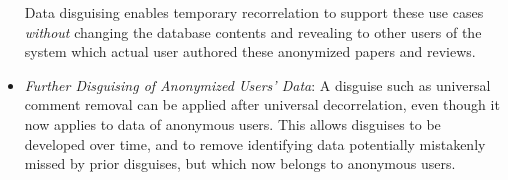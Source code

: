 \begin{itemize}
Data disguising enables temporary recorrelation to support these use cases \emph{without} changing
        the database contents and revealing to other users of the system
which actual user authored these anonymized papers and reviews.

\item \emph{Further Disguising of Anonymized Users' Data}: A disguise such as universal comment
        removal can be applied after universal decorrelation, even though it now applies to data of anonymous users.
This allows disguises to be developed over time, and to remove identifying data potentially mistakenly missed by prior
disguises, but which now belongs to anonymous users.
\end{itemize}
\fi
